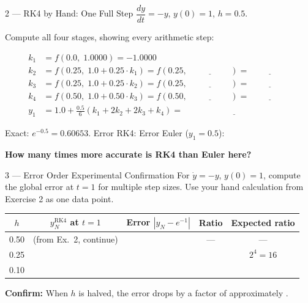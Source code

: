 \documentclass[12pt, a4paper]{article}
\begin{document}
\begin{solutionspace}[8cm]
\end{solutionspace}

\begin{exercisebox}{2 — RK4 by Hand: One Full Step}
$\dfrac{dy}{dt} = -y$, \quad $y(0) = 1$, \quad $h = 0.5$.

Compute all four stages, showing every arithmetic step:

\begin{align*}
k_1 &= f(0.0,\; 1.0000) = -1.0000\\[0.4em]
k_2 &= f\!\left(0.25,\; 1.0 + 0.25\cdot k_1\right) = f(0.25,\; \underline{\hspace{2cm}}) = \underline{\hspace{2cm}}\\[0.4em]
k_3 &= f\!\left(0.25,\; 1.0 + 0.25\cdot k_2\right) = f(0.25,\; \underline{\hspace{2cm}}) = \underline{\hspace{2cm}}\\[0.4em]
k_4 &= f\!\left(0.50,\; 1.0 + 0.50\cdot k_3\right) = f(0.50,\; \underline{\hspace{2cm}}) = \underline{\hspace{2cm}}\\[0.8em]
y_1 &= 1.0 + \frac{0.5}{6}(k_1 + 2k_2 + 2k_3 + k_4) = \underline{\hspace{5cm}}
\end{align*}

Exact: $e^{-0.5} = 0.60653$. \quad
Error RK4: \underline{\hspace{2cm}} \quad
Error Euler ($y_1 = 0.5$): \underline{\hspace{2cm}}

\textbf{How many times more accurate is RK4 than Euler here?}
\end{exercisebox}

\begin{solutionspace}[5cm]
\end{solutionspace}

\begin{exercisebox}{3 — Error Order Experimental Confirmation}
For $\dot{y}=-y$, $y(0)=1$, compute the global error at $t=1$ for multiple step sizes.
Use your hand calculation from Exercise 2 as one data point.

\begin{center}
\begin{tabular}{|c|c|c|c|c|}
\hline
$h$ & $y_N^{\text{RK4}}$ at $t=1$ & Error $|y_N - e^{-1}|$ & Ratio & Expected ratio \\
\hline
0.50 & (from Ex.~2, continue) & & — & — \\
\hline
0.25 & & & & $2^4 = 16$ \\
\hline
0.10 & & & & \\
\hline
\end{tabular}
\end{center}

\textbf{Confirm:} When $h$ is halved, the error drops by a factor of approximately \underline{\hspace{1cm}}.
\end{exercisebox}
\end{document}
